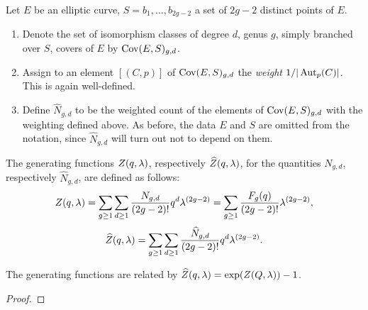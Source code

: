 \begin{defi} Let $E$ be an elliptic curve, $S={b_1,\dotsc,b_{2g-2}}$ a set of $2g-2$ distinct points of $E$.
 \begin{enumerate}
  \item Denote the set of isomorphism classes of degree $d$, genus $g$, simply branched over $S$, covers of $E$ by $\operatorname{Cov}(E,S)_{g,d}$.
 
  \item Assign to an element $[(C,p)]$ of $\operatorname{Cov}(E,S)_{g,d}$ the \emph{weight} $1/|\operatorname{Aut}_p(C)|$. This is again well-defined.
 
  \item Define $\widehat{N}_{g,d}$ to be the weighted count of the elements of $\operatorname{Cov}(E,S)_{g,d}$ with the weighting defined above. As before, the data $E$ and $S$ are omitted from the notation, since $\widehat{N}_{g,d}$ will turn out not to depend on them. 
 \end{enumerate}
\end{defi}

\begin{defi}
 The generating functions $Z(q,\lambda)$, respectively $\widehat{Z}(q,\lambda)$, for the quantities $N_{g,d}$, respectively $\widehat{N}_{g,d}$, are defined as follows:
 \[Z(q,\lambda) = \sum_{g\geq 1}\sum_{d\geq 1} \frac{N_{g,d}}{(2g-2)!}q^d\lambda^{(2g-2)} 
 = \sum_{g\geq 1}\frac{F_g(q)}{(2g-2)!}\lambda^{(2g-2)},\]
 \[\widehat{Z}(q,\lambda) = \sum_{g\geq 1}\sum_{d\geq 1} \frac{\widehat{N}_{g,d}}{(2g-2)!}q^d\lambda^{(2g-2)}.\]
\end{defi}

\begin{lemma}
 The generating functions are related by $\widehat{Z}(q,\lambda) = \exp(Z(Q,\lambda)) - 1$.
\end{lemma}

\begin{proof}
\end{proof}